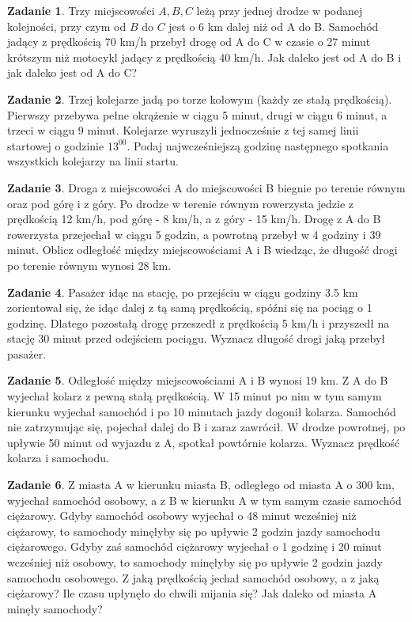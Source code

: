 \documentclass[11pt]{article}
\theoremstyle{definition}
\newtheorem{zad}{Zadanie}
\numberwithin{zad}{section}
\begin{document}
\begin{zad}
Trzy miejscowości $A, B, C$ leżą przy jednej drodze w podanej kolejności, przy czym od $B$ do $C$ jest o 6 km dalej niż od A do B. Samochód jadący z prędkością 70 km/h przebył drogę od A do C w czasie o 27 minut krótszym niż motocykl jadący z prędkością 40 km/h. Jak daleko jest od A do B i jak daleko jest od A do C?
\end{zad}

\begin{zad}
Trzej kolejarze jadą po torze kołowym (każdy ze stałą prędkością). Pierwszy przebywa pełne okrążenie w ciągu 5 minut, drugi w ciągu 6 minut, a trzeci w ciągu 9 minut. Kolejarze wyruszyli jednocześnie z tej samej linii startowej o godzinie $13^{00}$. Podaj najwcześniejszą godzinę następnego spotkania wszystkich kolejarzy na linii startu.
\end{zad}

\begin{zad}
Droga z miejscowości A do miejscowości B biegnie po terenie równym oraz pod górę i z góry. Po drodze w terenie równym rowerzysta jedzie z prędkością 12 km/h, pod górę - 8 km/h, a z góry - 15 km/h. Drogę z A do B rowerzysta przejechał w ciągu 5 godzin, a powrotną przebył w 4 godziny i 39 minut. Oblicz odległość między miejscowościami A i B wiedząc, że długość drogi po terenie równym wynosi 28 km.
\end{zad}

\begin{zad}
Pasażer idąc na stację, po przejściu w ciągu godziny 3.5 km zorientował się, że idąc dalej z tą samą prędkością, spóźni się na pociąg o 1 godzinę. Dlatego pozostałą drogę przeszedł z prędkością 5 km/h i przyszedł na stację 30 minut przed odejściem pociągu. Wyznacz długość drogi jaką przebył pasażer.
\end{zad}

\begin{zad}
Odległość między miejscowościami A i B wynosi 19 km. Z A do B wyjechał kolarz z pewną stałą prędkością. W 15 minut po nim w tym samym kierunku wyjechał samochód i po 10 minutach jazdy dogonił kolarza. Samochód nie zatrzymując się, pojechał dalej do B i zaraz zawrócił. W drodze powrotnej, po upływie 50 minut od wyjazdu z A, spotkał powtórnie kolarza. Wyznacz prędkość kolarza i samochodu.
\end{zad}

\begin{zad}
Z miasta A w kierunku miasta B, odległego od miasta A o 300 km, wyjechał samochód osobowy, a z B w kierunku A w tym samym czasie samochód ciężarowy. Gdyby samochód osobowy wyjechał o 48 minut wcześniej niż ciężarowy, to samochody minęłyby się po upływie 2 godzin jazdy samochodu ciężarowego. Gdyby zaś samochód ciężarowy wyjechał o 1 godzinę i 20 minut wcześniej niż osobowy, to samochody minęłyby się po upływie 2 godzin jazdy samochodu osobowego. Z jaką prędkością jechał samochód osobowy, a z jaką ciężarowy? Ile czasu upłynęło do chwili mijania się? Jak daleko od miasta A minęły samochody?
\end{zad}
\end{document}
